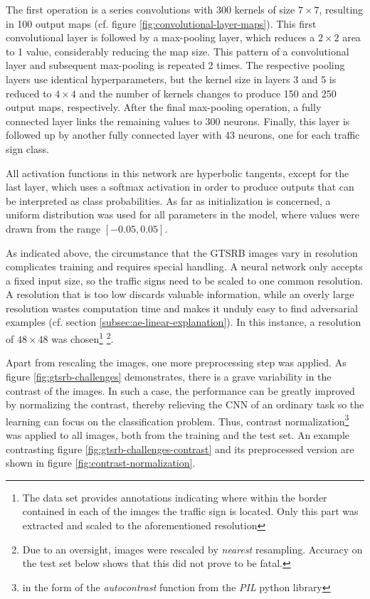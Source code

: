 \documentclass[11pt, a4paper]{article}
\newcommand\brackets[1]{\left[#1\right]}
\begin{document}
The first operation is a series convolutions with 300 kernels of size $7 \times 7$, resulting in 100 output maps (cf. figure \ref{fig:convolutional-layer-maps}). This first convolutional layer is followed by a max-pooling layer, which reduces a $2 \times 2$ area to 1 value, considerably reducing the map size. This pattern of a convolutional layer and subsequent max-pooling is repeated 2 times. The respective pooling layers use identical hyperparameters, but the kernel size in layers 3 and 5 is reduced to $ 4 \times 4$ and the number of kernels changes to produce 150 and 250 output maps, respectively. After the final max-pooling operation, a fully connected layer links the remaining values to 300 neurons. Finally, this layer is followed up by another fully connected layer with 43 neurons, one for each traffic sign class.

All activation functions in this network are hyperbolic tangents, except for the last layer, which uses a softmax activation in order to produce outputs that can be interpreted as class probabilities. As far as initialization is concerned, a uniform distribution was used for all parameters in the model, where values were drawn from the range $\brackets{-0.05, 0.05}$.

As indicated above, the circumstance that the GTSRB images vary in resolution complicates training and requires special handling. A neural network only accepts a fixed input size, so the traffic signs need to be scaled to one common resolution. A resolution that is too low discards valuable information, while an overly large resolution wastes computation time and makes it unduly easy to find adversarial examples (cf. section \ref{subsec:ae-linear-explanation}). In this instance, a resolution of $48 \times 48$ was chosen\footnote{The data set provides annotations indicating where within the border contained in each of the images the traffic sign is located. Only this part was extracted and scaled to the aforementioned resolution} \footnote{Due to an oversight, images were rescaled by \emph{nearest} resampling. Accuracy on the test set below shows that this did not prove to be fatal.}.

Apart from rescaling the images, one more preprocessing step was applied. As figure \ref{fig:gtsrb-challenges} demonstrates, there is a grave variability in the contrast of the images. In such a case, the performance can be greatly improved by normalizing the contrast, thereby relieving the CNN of an ordinary task so the learning can focus on the classification problem. Thus, contrast normalization\footnote{in the form of the \emph{autocontrast} function from the \emph{PIL} python library} was applied to all images, both from the training and the test set. An example contrasting figure \ref{fig:gtsrb-challenges-contrast} and its preprocessed version are shown in figure \ref{fig:contrast-normalization}.
\end{document}
